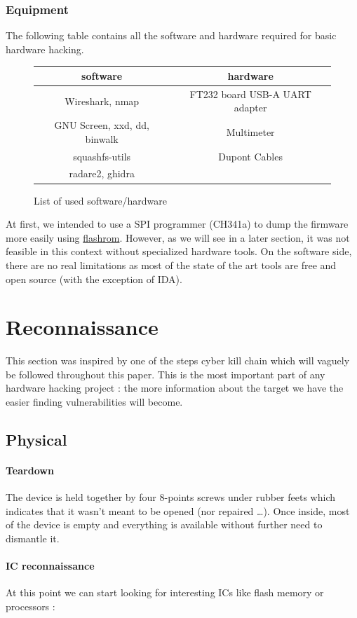 \documentclass{article}
\begin{document}
\subsubsection{Equipment}
The following table contains all the software and hardware required for basic hardware hacking. 
\begin{figure}[!ht]
\begin{tabular}{|c|c|}
	\hline
	software & hardware \\
	\hline
	Wireshark, nmap & FT232 board USB-A UART adapter \\
	GNU Screen, xxd, dd, binwalk &  Multimeter \\
	squashfs-utils & Dupont Cables \\
	radare2, ghidra & \\
	\hline
\end{tabular}
\caption{List of used software/hardware}
\end{figure}


At first, we intended to use a SPI programmer (CH341a) to dump the firmware more easily using \href{https://github.com/flashrom/flashrom}{flashrom}. However, as we will see in a later section, it was not feasible in this context without specialized hardware tools. On the software side, there are no real limitations as most of the state of the art tools are free and open source (with the exception of IDA).
\section{Reconnaissance}
This section was inspired by one of the steps cyber kill chain which will vaguely be followed throughout this paper. This is the most important part of any hardware hacking project : the more information about the target we have the easier finding vulnerabilities will become.
\subsection{Physical}
\paragraph{Teardown} The device is held together by four 8-points screws under rubber feets which indicates that it wasn't meant to be opened (nor repaired \dots). Once inside, most of the device is empty and everything is available without further need to dismantle it. 

\paragraph{IC reconnaissance} At this point we can start looking for interesting ICs like flash memory or processors :
\end{document}
